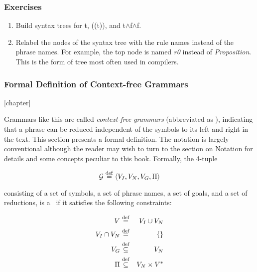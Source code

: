 \subsubsection{Exercises}
\begin{enumerate}\setcounter{enumi}{\value{RunningExercise}}
\begin{enumerate}

\item Build syntax trees for t, ((t)), and t$\wedge$f$\wedge$f.

\item Relabel the nodes of the syntax tree with the rule names 
instead of the phrase names.
For example, the top node is named {\em r0} instead of {\em Proposition}.
This is the form of tree most often used in compilers.

\setcounter{RunningExercise}{\value{enumi}}
\end{enumerate}

\subsubsection{Formal Definition of Context-free Grammars}

[chapter]
\setcounter{GrammarDef}{\value{equation}}

Grammars like this are called {\em context-free grammars} 
(abbreviated as \cfg), 
indicating that a phrase can be reduced independent of the
symbols to its left and right in the text.  
This section presents a formal definition.  
The notation is largely conventional although the reader may wish 
to turn to the section on Notation for details and some
concepts peculiar to this book.  Formally, the 4-tuple

\begin{samepage}
\begin{equation}
{\cal G} \stackrel{\rm def}{=} \langle V_I, V_N, V_G, \Pi\rangle
\label{GrammarDefinition}
\end{equation}
\index{$\Pi$}

\noindent
consisting of a set of symbols, a set of phrase names, 
a set of goals, and a set of reductions, 
is a \cfg\ if it satisfies the following constraints:

\begin{eqnarray*}
     V                &\stackrel{\rm def}{=}& V_I \cup V_N        \\
     V_I \cap V_N     &\stackrel{\rm def}{=}& \{\}				        \\
     V_G	      &\stackrel{\rm def}{\subseteq}& V_N			            \\
     \Pi	      &\stackrel{\rm def}{\subseteq}& V_N\times V^*
\end{eqnarray*}
\end{samepage}


\end{enumerate}
